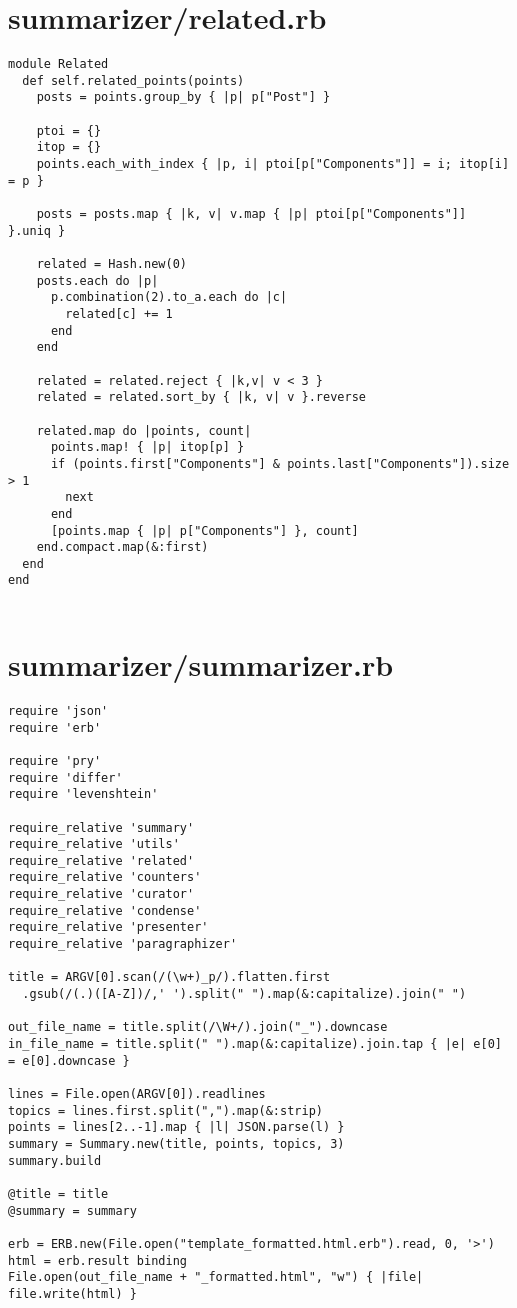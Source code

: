 \documentclass{article}
\begin{document}
\section*{summarizer/related.rb}
\begin{verbatim}
module Related
  def self.related_points(points)
    posts = points.group_by { |p| p["Post"] }

    ptoi = {}
    itop = {}
    points.each_with_index { |p, i| ptoi[p["Components"]] = i; itop[i] = p }

    posts = posts.map { |k, v| v.map { |p| ptoi[p["Components"]] }.uniq }

    related = Hash.new(0)
    posts.each do |p|
      p.combination(2).to_a.each do |c|
        related[c] += 1
      end
    end

    related = related.reject { |k,v| v < 3 }
    related = related.sort_by { |k, v| v }.reverse

    related.map do |points, count|
      points.map! { |p| itop[p] }
      if (points.first["Components"] & points.last["Components"]).size > 1
        next
      end
      [points.map { |p| p["Components"] }, count]
    end.compact.map(&:first)
  end
end


\end{verbatim}
\pagebreak

\section*{summarizer/summarizer.rb}
\begin{verbatim}
require 'json'
require 'erb'

require 'pry'
require 'differ'
require 'levenshtein'

require_relative 'summary'
require_relative 'utils'
require_relative 'related'
require_relative 'counters'
require_relative 'curator'
require_relative 'condense'
require_relative 'presenter'
require_relative 'paragraphizer'

title = ARGV[0].scan(/(\w+)_p/).flatten.first
  .gsub(/(.)([A-Z])/,' ').split(" ").map(&:capitalize).join(" ")

out_file_name = title.split(/\W+/).join("_").downcase
in_file_name = title.split(" ").map(&:capitalize).join.tap { |e| e[0] = e[0].downcase }

lines = File.open(ARGV[0]).readlines
topics = lines.first.split(",").map(&:strip)
points = lines[2..-1].map { |l| JSON.parse(l) }
summary = Summary.new(title, points, topics, 3)
summary.build

@title = title
@summary = summary

erb = ERB.new(File.open("template_formatted.html.erb").read, 0, '>')
html = erb.result binding
File.open(out_file_name + "_formatted.html", "w") { |file| file.write(html) }


\end{verbatim}
\pagebreak
\end{document}

